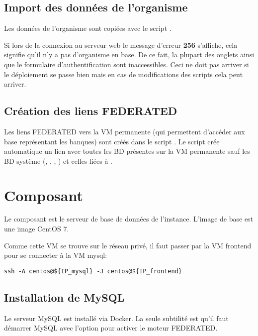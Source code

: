 \subsection{Import des données de l'organisme \theOrg{}}

Les données de l'organisme \theOid{} sont copiées avec le script .

\begin{warningbox}
    Si lors de la connexion au serveur web le message d'erreur \textbf{256} s'affiche, cela signifie qu'il n'y a pas d'organisme en base.
    De ce fait, la plupart des onglets ainsi que le formulaire d'authentification sont inaccessibles.
    Ceci ne doit pas arriver si le déploiement se passe bien mais en cas de modifications des scripts cela peut arriver.
\end{warningbox}

\subsection{Création des liens FEDERATED}

Les liens FEDERATED vers la VM permanente (qui permettent d'accéder aux base représentant les banques) sont créés
dans le script .
Le script crée automatique un lien avec toutes les BD présentes sur la VM permanente sauf les BD système (, , , )
et celles liées à .

\section{Composant }\label{mysql}

Le composant  est le serveur de base de données de l'instance.
L'image de base est une image CentOS 7.

Comme cette VM se trouve sur le réseau privé, il faut passer par la VM frontend pour se connecter à la VM mysql:
\begin{lstlisting}[style=bash]
ssh -A centos@${IP_mysql} -J centos@${IP_frontend}
\end{lstlisting}

\subsection{Installation de MySQL}

Le serveur MySQL est installé via Docker.
La seule subtilité est qu'il faut démarrer MySQL avec l'option  pour activer le moteur FEDERATED.

